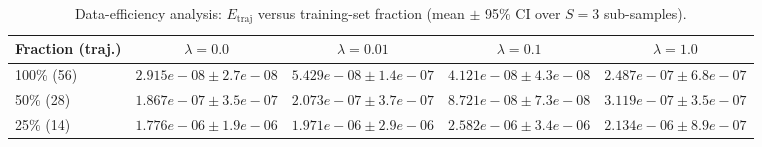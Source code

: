 \begin{table}[t]
\centering
\small
\caption{Data-efficiency analysis: $E_{\mathrm{traj}}$ versus training-set fraction (mean $\pm$ 95\% CI over $S=3$ sub-samples).}
\label{tab:data_efficiency}
\begin{tabular}{lcccc}
\hline
Fraction (traj.) & $\lambda=0.0$ & $\lambda=0.01$ & $\lambda=0.1$ & $\lambda=1.0$ \\
\hline
100\% (56) & $2.915e-08 \pm 2.7e-08$ & $5.429e-08 \pm 1.4e-07$ & $4.121e-08 \pm 4.3e-08$ & $2.487e-07 \pm 6.8e-07$ \\
50\% (28) & $1.867e-07 \pm 3.5e-07$ & $2.073e-07 \pm 3.7e-07$ & $8.721e-08 \pm 7.3e-08$ & $3.119e-07 \pm 3.5e-07$ \\
25\% (14) & $1.776e-06 \pm 1.9e-06$ & $1.971e-06 \pm 2.9e-06$ & $2.582e-06 \pm 3.4e-06$ & $2.134e-06 \pm 8.9e-07$ \\
\hline
\end{tabular}
\end{table}